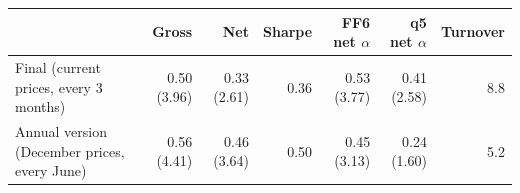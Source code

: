 \begin{tabular}{p{4.6cm}rrrrrr}
\toprule
 & Gross & Net & Sharpe & FF6 net $\alpha$ & q5 net $\alpha$ & Turnover \\
\midrule
Final (current prices, every 3 months) & 0.50 (3.96) & 0.33 (2.61) & 0.36 & 0.53 (3.77) & 0.41 (2.58) & 8.8 \\
Annual version (December prices, every June) & 0.56 (4.41) & 0.46 (3.64) & 0.50 & 0.45 (3.13) & 0.24 (1.60) & 5.2 \\
\bottomrule
\end{tabular}
